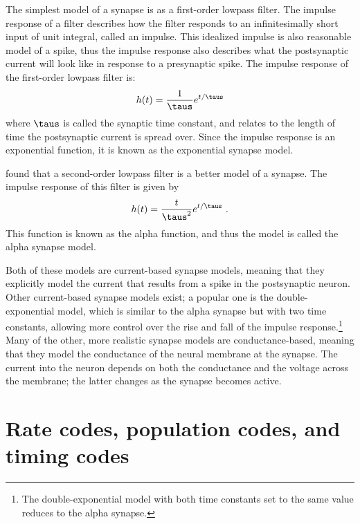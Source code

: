 The simplest model of a synapse is as a first-order lowpass filter.
The impulse response of a filter describes how the filter responds to
an infinitesimally short input of unit integral, called an impulse.
This idealized impulse is also reasonable model of a spike,
thus the impulse response also describes what the postsynaptic current
will look like in response to a presynaptic spike.
The impulse response of the first-order lowpass filter is:
\begin{align}
  h(t) = \frac{1}{\taus} e^{t / \taus}
  \eqnlabel{expo-synapse}
\end{align}
where $\taus$ is called the synaptic time constant,
and relates to the length of time the postsynaptic current is spread over.
Since the impulse response is an exponential function,
it is known as the exponential synapse model.

\textcite{Mainen1995} found that a second-order lowpass filter
is a better model of a synapse.
The impulse response of this filter is given by
\begin{align}
  h(t) = \frac{t}{\taus^2} e^{t / \taus} \text{ .}
  \eqnlabel{alpha-synapse}
\end{align}
This function is known as the alpha function,
and thus the model is called the alpha synapse model.

Both of these models are current-based synapse models,
meaning that they explicitly model the current that results from a spike
in the postsynaptic neuron.
Other current-based synapse models exist;
a popular one is the double-exponential model,
which is similar to the alpha synapse but with two time constants,
allowing more control over the rise and fall of the impulse response.\footnote{
  The double-exponential model with both time constants set to the same value
  reduces to the alpha synapse.}
Many of the other, more realistic synapse models are conductance-based,
meaning that they model the conductance of the neural membrane at the synapse.
The current into the neuron depends on both the conductance
and the voltage across the membrane;
the latter changes as the synapse becomes active.


\section{Rate codes, population codes, and timing codes}

